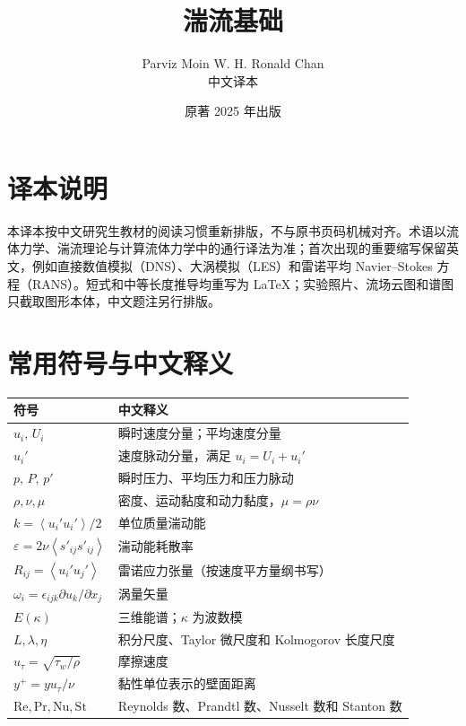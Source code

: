 \documentclass[12pt,a4paper,openany,fontset=none]{ctexbook}
\title{湍流基础}
\author{Parviz Moin \quad W. H. Ronald Chan\\[.7em]\large 中文译本}
\date{原著 2025 年出版}
\newcommand{\Rey}{\mathrm{Re}}
\newcommand{\Pran}{\mathrm{Pr}}
\newcommand{\St}{\mathrm{St}}
\newcommand{\Nu}{\mathrm{Nu}}
\newcommand{\avg}[1]{\left\langle #1\right\rangle}
\begin{document}
\frontmatter
\maketitle
\chapter*{译本说明}
本译本按中文研究生教材的阅读习惯重新排版，不与原书页码机械对齐。术语以流体力学、湍流理论与计算流体力学中的通行译法为准；首次出现的重要缩写保留英文，例如直接数值模拟（DNS）、大涡模拟（LES）和雷诺平均 Navier--Stokes 方程（RANS）。短式和中等长度推导均重写为 LaTeX；实验照片、流场云图和谱图只截取图形本体，中文题注另行排版。

\tableofcontents

\chapter*{常用符号与中文释义}
\begin{longtable}{>{\centering\arraybackslash}p{}p{}}
\toprule 符号 & 中文释义\\ \midrule
$u_i,\,U_i$ & 瞬时速度分量；平均速度分量\\
$u_i'$ & 速度脉动分量，满足 $u_i=U_i+u_i'$\\
$p,\,P,\,p'$ & 瞬时压力、平均压力和压力脉动\\
$\rho,\nu,\mu$ & 密度、运动黏度和动力黏度，$\mu=\rho\nu$\\
$k=\avg{u_i'u_i'}/2$ & 单位质量湍动能\\
$\varepsilon=2\nu\avg{s'_{ij}s'_{ij}}$ & 湍动能耗散率\\
$R_{ij}=\avg{u_i'u_j'}$ & 雷诺应力张量（按速度平方量纲书写）\\
$\omega_i=\epsilon_{ijk}\partial u_k/\partial x_j$ & 涡量矢量\\
$E(\kappa)$ & 三维能谱；$\kappa$ 为波数模\\
$L,\lambda,\eta$ & 积分尺度、Taylor 微尺度和 Kolmogorov 长度尺度\\
$u_\tau=\sqrt{\tau_w/\rho}$ & 摩擦速度\\
$y^+=yu_\tau/\nu$ & 黏性单位表示的壁面距离\\
$\Rey,\Pran,\Nu,\St$ & Reynolds 数、Prandtl 数、Nusselt 数和 Stanton 数\\
\bottomrule
\end{longtable}
\end{document}
